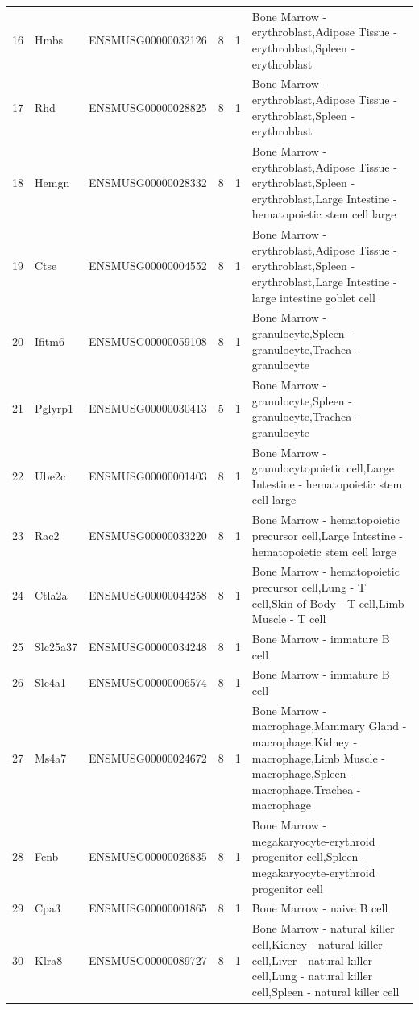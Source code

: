 \begin{table}[ht]
{\begin{tabular}{lllrrl}
        16 & Hmbs & ENSMUSG00000032126 & 8 & 1 & Bone Marrow - erythroblast,Adipose Tissue - erythroblast,Spleen - erythroblast \\
        17 & Rhd & ENSMUSG00000028825 & 8 & 1 & Bone Marrow - erythroblast,Adipose Tissue - erythroblast,Spleen - erythroblast \\
        18 & Hemgn & ENSMUSG00000028332 & 8 & 1 & Bone Marrow - erythroblast,Adipose Tissue - erythroblast,Spleen - erythroblast,Large Intestine - hematopoietic stem cell large \\
        19 & Ctse & ENSMUSG00000004552 & 8 & 1 & Bone Marrow - erythroblast,Adipose Tissue - erythroblast,Spleen - erythroblast,Large Intestine - large intestine goblet cell \\
        20 & Ifitm6 & ENSMUSG00000059108 & 8 & 1 & Bone Marrow - granulocyte,Spleen - granulocyte,Trachea - granulocyte \\
        21 & Pglyrp1 & ENSMUSG00000030413 & 5 & 1 & Bone Marrow - granulocyte,Spleen - granulocyte,Trachea - granulocyte \\
        22 & Ube2c & ENSMUSG00000001403 & 8 & 1 & Bone Marrow - granulocytopoietic cell,Large Intestine - hematopoietic stem cell large \\
        23 & Rac2 & ENSMUSG00000033220 & 8 & 1 & Bone Marrow - hematopoietic precursor cell,Large Intestine - hematopoietic stem cell large \\
        24 & Ctla2a & ENSMUSG00000044258 & 8 & 1 & Bone Marrow - hematopoietic precursor cell,Lung - T cell,Skin of Body - T cell,Limb Muscle - T cell \\
        25 & Slc25a37 & ENSMUSG00000034248 & 8 & 1 & Bone Marrow - immature B cell \\
        26 & Slc4a1 & ENSMUSG00000006574 & 8 & 1 & Bone Marrow - immature B cell \\
        27 & Ms4a7 & ENSMUSG00000024672 & 8 & 1 & Bone Marrow - macrophage,Mammary Gland - macrophage,Kidney - macrophage,Limb Muscle - macrophage,Spleen - macrophage,Trachea - macrophage \\
        28 & Fcnb & ENSMUSG00000026835 & 8 & 1 & Bone Marrow - megakaryocyte-erythroid progenitor cell,Spleen - megakaryocyte-erythroid progenitor cell \\
        29 & Cpa3 & ENSMUSG00000001865 & 8 & 1 & Bone Marrow - naive B cell \\
        30 & Klra8 & ENSMUSG00000089727 & 8 & 1 & Bone Marrow - natural killer cell,Kidney - natural killer cell,Liver - natural killer cell,Lung - natural killer cell,Spleen - natural killer cell \\

\end{tabular}}
\end{table}
